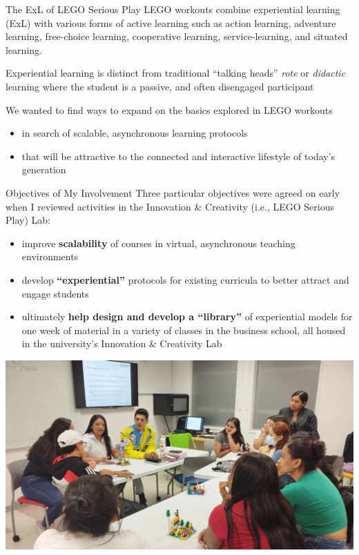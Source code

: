 \documentclass[
  ignorenonframetext,
]{beamer}
\providecommand{\tightlist}{%
  \setlength{\itemsep}{0pt}\setlength{\parskip}{0pt}}
\begin{document}
\begin{frame}{The ExL of LEGO Serious Play}
\label{the-exl-of-lego-serious-play}
LEGO workouts combine experiential learning (ExL) with various forms of
active learning such as action learning, adventure learning, free-choice
learning, cooperative learning, service-learning, and situated learning.

Experiential learning is distinct from traditional ``talking heads''
\emph{rote} or \emph{didactic} learning where the student is a passive,
and often disengaged participant

We wanted to find ways to expand on the basics explored in LEGO workouts

\begin{itemize}
\tightlist
\item
  in search of scalable, asynchronous learning protocols
\item
  that will be attractive to the connected and interactive lifestyle of
  today's generation
\end{itemize}
\end{frame}

\begin{frame}{Objectives of My Involvement}
\label{objectives-of-my-involvement}
Three particular objectives were agreed on early when I reviewed
activities in the Innovation \& Creativity (i.e., LEGO Serious Play)
Lab:

\begin{itemize}
\tightlist
\item
  improve \textbf{scalability} of courses in virtual, asynchronous
  teaching environments
\item
  develop \textbf{``experiential''} protocols for existing curricula to
  better attract and engage students
\item
  ultimately \textbf{help design and develop a ``library''} of
  experiential models for one week of material in a variety of classes
  in the business school, all housed in the university's Innovation \&
  Creativity Lab
\end{itemize}

\begin{flushleft}\includegraphics[width=0.15\linewidth]{students4} \end{flushleft}
\end{frame}
\end{document}
